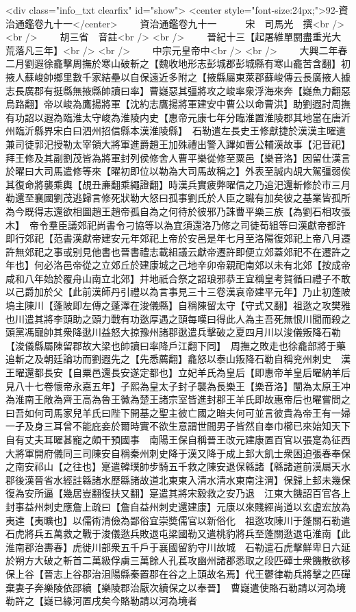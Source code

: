 <div class="info_txt clearfix" id="show">
<center style="font-size:24px;">92-資治通鑑卷九十一</center>
  　　資治通鑑卷九十一　　　宋　司馬光　撰<br />
<br />
　　胡三省　音註<br />
<br />
　　晉紀十三【起屠維單閼盡重光大荒落凡三年】<br />
<br />
　　中宗元皇帝中<br />
<br />
　　大興二年春二月劉遐徐龕擊周撫於寒山破斬之【魏收地形志彭城郡彭城縣有寒山龕苦含翻】初掖人蘇峻帥鄉里數千家結壘以自保遠近多附之【掖縣屬東萊郡蘇峻傳云長廣掖人據志長廣郡有挺縣無掖縣帥讀曰率】曹嶷惡其彊將攻之峻率衆浮海來奔【嶷魚力翻惡烏路翻】帝以峻為鷹揚將軍【沈約志鷹揚將軍建安中曹公以命曹洪】助劉遐討周撫有功詔以遐為臨淮太守峻為淮陵内史【惠帝元康七年分臨淮置淮陵郡其地當在唐沂州臨沂縣界宋白曰泗州招信縣本漢淮陵縣】　石勒遣左長史王修獻捷於漢漢主曜遣兼司徒郭汜授勒太宰領大將軍進爵趙王加殊禮出警入蹕如曹公輔漢故事【汜音祀】拜王修及其副劉茂皆為將軍封列侯修舍人曹平樂從修至粟邑【樂音洛】因留仕漢言於曜曰大司馬遣修等來【曜初即位以勒為大司馬故稱之】外表至誠内覘大駕彊弱俟其復命將襲乘輿【覘丑亷翻乘繩證翻】時漢兵實疲弊曜信之乃追汜還斬修於市三月勒還至襄國劉茂逃歸言修死狀勒大怒曰孤事劉氏於人臣之職有加矣彼之基業皆孤所為今既得志還欲相圖趙王趙帝孤自為之何待於彼邪乃誅曹平樂三族【為劉石相攻張木】　帝令羣臣議郊祀尚書令刁協等以為宜須還洛乃修之司徒荀組等曰漢獻帝都許即行郊祀【范書漢獻帝建安元年郊祀上帝於安邑是年七月至洛陽復郊祀上帝八月遷許無郊祀之事或别見他書也晉書禮志載組議云獻帝遷許即便立郊蓋郊祀不在遷許之年也】何必洛邑帝從之立郊丘於建康城之己地辛卯帝親祀南郊以未有北郊【按成帝咸和八年始於覆舟山南立北郊】并地祇合祭之詔琅邪恭王宜稱皇考賀循曰禮子不敢以己爵加於父【此前漢師丹引禮以為言事見三十三卷漢哀帝建平元年】乃止初蓬陂塢主陳川【蓬陂即左傳之蓬澤在浚儀縣】自稱陳留太守【守式又翻】祖逖之攻樊雅也川遣其將李頭助之頭力戰有功逖厚遇之頭每嘆曰得此人為主吾死無恨川聞而殺之頭黨馮寵帥其衆降逖川益怒大掠豫州諸郡逖遣兵擊破之夏四月川以浚儀叛降石勒【浚儀縣屬陳留郡故大梁也帥讀曰率降戶江翻下同】　周撫之敗走也徐龕部將于藥追斬之及朝廷論功而劉遐先之【先悉薦翻】龕怒以泰山叛降石勒自稱兖州刺史　漢王曜還都長安【自粟邑還長安遂定都也】立妃羊氏為皇后【即惠帝羊皇后曜納羊后見八十七卷懷帝永嘉五年】子熙為皇太子封子襲為長樂王【樂音洛】闡為太原王冲為淮南王敞為齊王高為魯王徽為楚王諸宗室皆進封郡王羊氏即故惠帝后也曜嘗問之曰吾如何司馬家兒羊氏曰陛下開基之聖主彼亡國之暗夫何可並言彼貴為帝王有一婦一子及身三耳曾不能庇妾於爾時實不欲生意謂世間男子皆然自奉巾櫛已來始知天下自有丈夫耳曜甚寵之頗干預國事　南陽王保自稱晉王改元建康置百官以張寔為征西大將軍開府儀同三司陳安自稱秦州刺史降于漢又降于成上邽大飢士衆困迫張春奉保之南安祁山【之往也】寔遣韓璞帥步騎五千救之陳安退保緜諸【緜諸道前漢屬天水郡後漢晉省水經註緜諸水歷緜諸故道北東東入清水清水東南注渭】保歸上邽未幾保復為安所逼【幾居豈翻復扶又翻】寔遣其將宋毅救之安乃退　江東大饑詔百官各上封事益州刺史應詹上疏曰【詹自益州刺史還建康】元康以來賤經尚道以玄虚宏放為夷達【夷曠也】以儒術清儉為鄙俗宜崇奬儒官以新俗化　祖逖攻陳川于蓬關石勒遣石虎將兵五萬救之戰于浚儀逖兵敗退屯梁國勒又遣桃豹將兵至蓬關逖退屯淮南【此淮南郡治夀春】虎徙川部衆五千戶于襄國留豹守川故城　石勒遣石虎擊鮮卑日六延於朔方大破之斬首二萬級俘虜三萬餘人孔萇攻幽州諸郡悉取之段匹磾士衆饑散欲移保上谷【晉志上谷郡治沮陽縣秦置郡在谷之上頭故名焉】代王鬱律勒兵將擊之匹磾棄妻子奔樂陵依邵續【樂陵郡治厭次續保之以奉晉】　曹嶷遣使賂石勒請以河為境勒許之【嶷已緣河置戌矣今賂勒請以河為境者